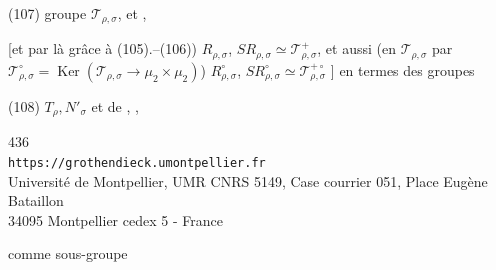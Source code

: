 \noindent(107) groupe $\mathcal{T}_{\rho,\sigma}$, et 
,

[et par là grâce à (105).--(106)) $R_{\rho,\sigma}$,
$SR_{\rho,\sigma}\simeq\mathcal{T}_{\rho,\sigma}^{+}$, et aussi
(en 
$\mathcal{T}_{\rho,\sigma}$ par
$\mathcal{T}_{\rho,\sigma}^{\circ}=\operatorname{Ker}
(\mathcal{T}_{\rho,\sigma}\longrightarrow\mu_2\times\mu_2)$)
$R_{\rho,\sigma}^{\circ}$,
$SR_{\rho,\sigma}^{\circ}\simeq\mathcal{T}_{\rho,\sigma}^{+\circ}$
\unsure{$\Rightarrow$}]
en termes des groupes

\noindent(108) $T_\rho,N'_\sigma$ et de
,
,


\begin{center}
{\small
436\\
\texttt{https://grothendieck.umontpellier.fr}\\
Université de Montpellier, UMR CNRS 5149, Case courrier 051, Place Eugène Bataillon\\
34095 Montpellier cedex 5 - France
}
\end{center}


comme sous-groupe


